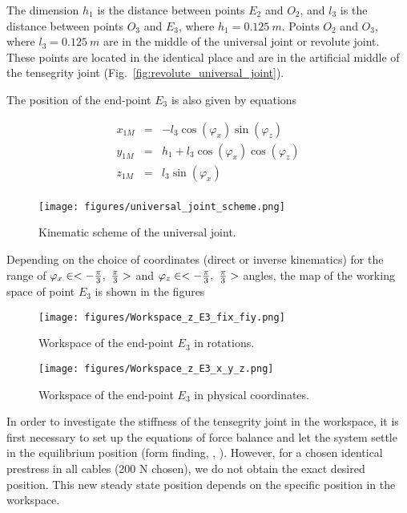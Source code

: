 \documentclass{article}
\begin{document}
The dimension $h_1$ is the distance between points $E_2$ and $O_2$, and $l_3$ is the distance between points $O_3$ and $E_3$, where $h_1 = 0.125\ m$. Points $O_2$ and $O_3$, where $l_3 = 0.125\ m$ are in the middle of the universal joint or revolute joint. These points are located in the identical place and are in the artificial middle of the tensegrity joint (Fig.~\ref{fig:revolute_universal_joint}).

The position of the end-point $E_3$ is also given by equations

\begin{eqnarray}
   x_{1M} &=& -l_3\cos(\varphi_x)\sin(\varphi_z)\\
   y_{1M} &=& h_1 + l_3 \cos(\varphi_x) \cos(\varphi_z)\\
   z_{1M} &=& l_3 \sin(\varphi_x)\\
\end{eqnarray}


\begin{figure}[h!]
    \centering
    \texttt{[image: figures/universal\_joint\_scheme.png]}
    \caption{Kinematic scheme of the universal joint.}
    \label{fig:universal_joint_scheme}
\end{figure}

Depending on the choice of coordinates (direct or inverse kinematics) for the range of $\varphi_x \in <-{\pi \over 3},\ {\pi \over 3}>$ and $\varphi_z \in <-{\pi \over 3},\ {\pi \over 3}>$ angles, the map of the working space of point $E_3$ is shown in the figures 

\begin{figure}[h!]
    \centering
    \texttt{[image: figures/Workspace\_z\_E3\_fix\_fiy.png]}
    \caption{Workspace of the end-point $E_3$ in rotations.}
    \label{fig:E2_rotations}
\end{figure}

\begin{figure}
    \centering
    \texttt{[image: figures/Workspace\_z\_E3\_x\_y\_z.png]}
    \caption{Workspace of the end-point $E_3$ in physical coordinates.}
    \label{fig:E2_physical_coordinates}
\end{figure}

In order to investigate the stiffness of the tensegrity joint in the workspace, it is first necessary to set up the equations of force balance and let the system settle in the equilibrium position (form finding, \cite{Ref_Hajzman_OWN_planning_method}, \cite{Ref_Krivosej_OWN_tensegrity_based_robots}). However, for a chosen identical prestress in all cables (200 N chosen), we do not obtain the exact desired position. This new steady state position depends on the specific position in the workspace.
\end{document}

